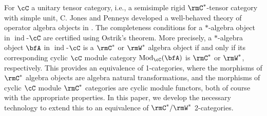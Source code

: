 \documentclass[11pt,reqno]{amsart}
\DeclareMathOperator{\ind}{ind}
\DeclareMathOperator{\Mod}{Mod}
\numberwithin{equation}{section}
\theoremstyle{plain}
\begin{document}
For $\cC$ a unitary tensor category, i.e., a semisimple rigid $\rmC^*$-tensor category with simple unit,
C. Jones and Penneys developed a well-behaved theory of operator algebra objects in \cite{JP17}.
The completeness conditions for a $*$-algebra object in $\ind$-$\cC$ are certified using Ostrik's theorem.
More precisely, a $*$-algebra object $\bfA$ in $\ind$-$\cC$ is a $\rmC^*$ or $\rmW^*$ algebra object if and only if its corresponding cyclic $\cC$ module category $\Mod_{\cC}(\bfA)$ is $\rmC^*$ or $\rmW^*$, respectively.
This provides an equivalence of 1-categories, where the morphisms of $\rmC^*$ algebra objects are algebra natural transformations, and the morphisms of cyclic $\cC$ module $\rmC^*$ categories are cyclic module functors, both of course with the appropriate properties.
In this paper, we develop the necessary technology to extend this to an equivalence of $\rmC^*/\rmW^*$ 2-categories.
\end{document}
